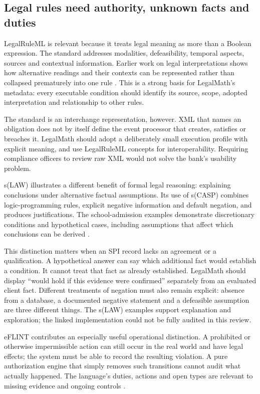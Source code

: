 \subsection{Legal rules need authority, unknown facts and duties}

LegalRuleML is relevant because it treats legal meaning as more than a Boolean
expression. The standard addresses modalities, defeasibility, temporal aspects,
sources and contextual information. Earlier work on legal interpretations shows
how alternative readings and their contexts can be represented rather than
collapsed prematurely into one rule
\citep[sec.~4]{legalinterpretations2014,legalruleml2021}. This is a strong basis
for LegalMath's metadata: every executable condition should identify its source,
scope, adopted interpretation and relationship to other rules.

The standard is an interchange representation, however. XML that names an
obligation does not by itself define the event processor that creates, satisfies
or breaches it. LegalMath should adopt a deliberately small execution profile
with explicit meaning, and use LegalRuleML concepts for interoperability. Requiring
compliance officers to review raw XML would not solve the bank's usability problem.

s(LAW) illustrates a different benefit of formal legal reasoning: explaining
conclusions under alternative factual assumptions. Its use of s(CASP) combines
logic-programming rules, explicit negative information and default negation, and
produces justifications. The school-admission examples demonstrate discretionary
conditions and hypothetical cases, including assumptions that affect which
conclusions can be derived \citep[secs.~4--5]{slaw2024}.

This distinction matters when an SPI record lacks an agreement or a qualification.
A hypothetical answer can say which additional fact would establish a condition.
It cannot treat that fact as already established. LegalMath should display
``would hold if this evidence were confirmed'' separately from an evaluated
client fact. Different treatments of negation must also remain explicit: absence
from a database, a documented negative statement and a defeasible assumption are
three different things. The s(LAW) examples support explanation and exploration;
the linked implementation could not be fully audited in this review.

eFLINT contributes an especially useful operational distinction. A prohibited or
otherwise impermissible action can still occur in the real world and have legal
effects; the system must be able to record the resulting violation. A pure
authorization engine that simply removes such transitions cannot audit what
actually happened. The language's duties, actions and open types are relevant
to missing evidence and ongoing controls \citep[secs.~3--5]{eflint2026}.

